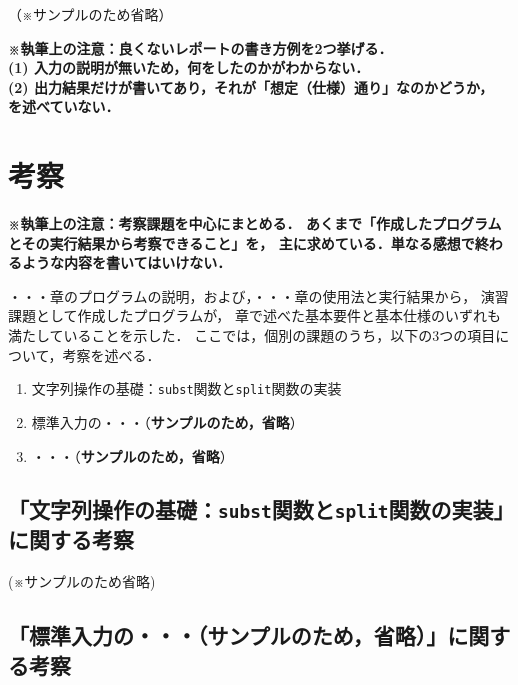 （※サンプルのため省略）


\textbf{\small ※執筆上の注意：良くないレポートの書き方例を2つ挙げる．\\
    (1) 入力の説明が無いため，何をしたのかがわからない．\\
    (2) 出力結果だけが書いてあり，それが「想定（仕様）通り」なのかどうか，
        を述べていない．\\}


\section{考察}
\textbf{\small ※執筆上の注意：考察課題を中心にまとめる．
    あくまで「作成したプログラムとその実行結果から考察できること」を，
    主に求めている．単なる感想で終わるような内容を書いてはいけない．\\}

・・・章のプログラムの説明，および，・・・章の使用法と実行結果から，
演習課題として作成したプログラムが，
\cite{sec:abstract}章で述べた基本要件と基本仕様のいずれも満たしていることを示した．
ここでは，個別の課題のうち，以下の3つの項目について，考察を述べる．

\begin{enumerate}
\setlength{\parskip}{2pt} \setlength{\itemsep}{2pt}
    \item 文字列操作の基礎：\texttt{subst}関数と\texttt{split}関数の実装
    \item 標準入力の・・・（\textbf{サンプルのため，省略}）
    \item ・・・（\textbf{サンプルのため，省略}）
\end{enumerate}

\subsection{「文字列操作の基礎：\texttt{subst}関数と\texttt{split}関数の実装」に関する考察}

(※サンプルのため省略)

\subsection{「標準入力の・・・（\textbf{サンプルのため，省略}）」に関する考察}

